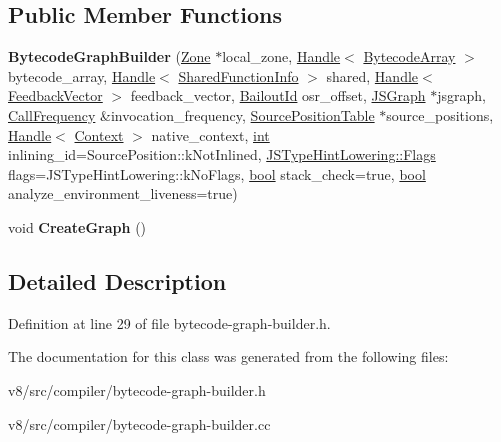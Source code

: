 \subsection*{Public Member Functions}
\begin{DoxyCompactItemize}
\item 
\mbox{\label{classv8_1_1internal_1_1compiler_1_1BytecodeGraphBuilder_a2b1be2460a6d55f05161f7814a5d5f8a}} 
{\bfseries Bytecode\+Graph\+Builder} (\mbox{\hyperlink{classv8_1_1internal_1_1Zone}{Zone}} $\ast$local\+\_\+zone, \mbox{\hyperlink{classv8_1_1internal_1_1Handle}{Handle}}$<$ \mbox{\hyperlink{classv8_1_1internal_1_1BytecodeArray}{Bytecode\+Array}} $>$ bytecode\+\_\+array, \mbox{\hyperlink{classv8_1_1internal_1_1Handle}{Handle}}$<$ \mbox{\hyperlink{classv8_1_1internal_1_1SharedFunctionInfo}{Shared\+Function\+Info}} $>$ shared, \mbox{\hyperlink{classv8_1_1internal_1_1Handle}{Handle}}$<$ \mbox{\hyperlink{classv8_1_1internal_1_1FeedbackVector}{Feedback\+Vector}} $>$ feedback\+\_\+vector, \mbox{\hyperlink{classv8_1_1internal_1_1BailoutId}{Bailout\+Id}} osr\+\_\+offset, \mbox{\hyperlink{classv8_1_1internal_1_1compiler_1_1JSGraph}{J\+S\+Graph}} $\ast$jsgraph, \mbox{\hyperlink{classv8_1_1internal_1_1compiler_1_1CallFrequency}{Call\+Frequency}} \&invocation\+\_\+frequency, \mbox{\hyperlink{classv8_1_1internal_1_1compiler_1_1SourcePositionTable}{Source\+Position\+Table}} $\ast$source\+\_\+positions, \mbox{\hyperlink{classv8_1_1internal_1_1Handle}{Handle}}$<$ \mbox{\hyperlink{classv8_1_1internal_1_1Context}{Context}} $>$ native\+\_\+context, \mbox{\hyperlink{classint}{int}} inlining\+\_\+id=Source\+Position\+::k\+Not\+Inlined, \mbox{\hyperlink{classv8_1_1base_1_1Flags}{J\+S\+Type\+Hint\+Lowering\+::\+Flags}} flags=J\+S\+Type\+Hint\+Lowering\+::k\+No\+Flags, \mbox{\hyperlink{classbool}{bool}} stack\+\_\+check=true, \mbox{\hyperlink{classbool}{bool}} analyze\+\_\+environment\+\_\+liveness=true)
\item 
\mbox{\label{classv8_1_1internal_1_1compiler_1_1BytecodeGraphBuilder_a860191a0719d4fa2c19c3790332dda80}} 
void {\bfseries Create\+Graph} ()
\end{DoxyCompactItemize}


\subsection{Detailed Description}


Definition at line 29 of file bytecode-\/graph-\/builder.\+h.



The documentation for this class was generated from the following files\+:\begin{DoxyCompactItemize}
\item 
v8/src/compiler/bytecode-\/graph-\/builder.\+h\item 
v8/src/compiler/bytecode-\/graph-\/builder.\+cc\end{DoxyCompactItemize}
